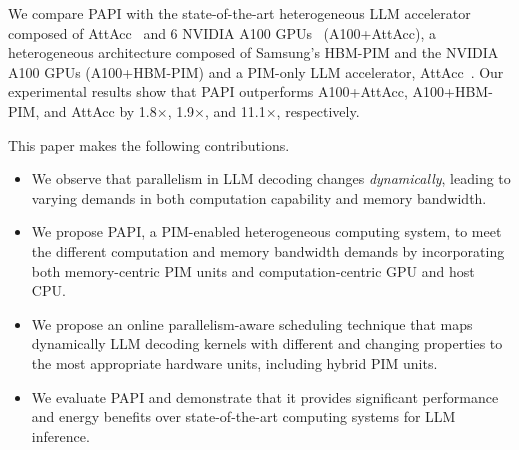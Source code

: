 We compare PAPI with the state-of-the-art heterogeneous LLM accelerator composed of AttAcc~\cite{park2024attacc} and 6 NVIDIA A100 GPUs~\cite{choquette2020nvidia} (A100+AttAcc), a heterogeneous architecture composed of Samsung's HBM-PIM \cite{lee2021hardware} and the NVIDIA A100 GPUs (A100+HBM-PIM) and a PIM-only LLM accelerator, AttAcc~\cite{park2024attacc}. 
Our experimental results show that PAPI outperforms A100+AttAcc, A100+HBM-PIM, and AttAcc by 1.8$\times$, 1.9$\times$, and 11.1$\times$, respectively.

This paper makes the following contributions.
\begin{itemize}[leftmargin=4mm,itemsep=0mm,parsep=0mm,topsep=0mm]
\item We observe that parallelism in LLM decoding changes \emph{dynamically}, leading to varying demands in both computation capability and memory bandwidth.
\item We propose PAPI, a PIM-enabled heterogeneous computing system, to meet the different computation and memory bandwidth demands by incorporating both memory-centric PIM units and computation-centric GPU and host CPU.
\item We propose an online parallelism-aware scheduling technique that maps dynamically LLM decoding kernels with different and changing properties to the most appropriate hardware units, including hybrid PIM units.
\item We evaluate PAPI and demonstrate that it provides significant performance and energy benefits over state-of-the-art computing systems for LLM inference.
\end{itemize}
